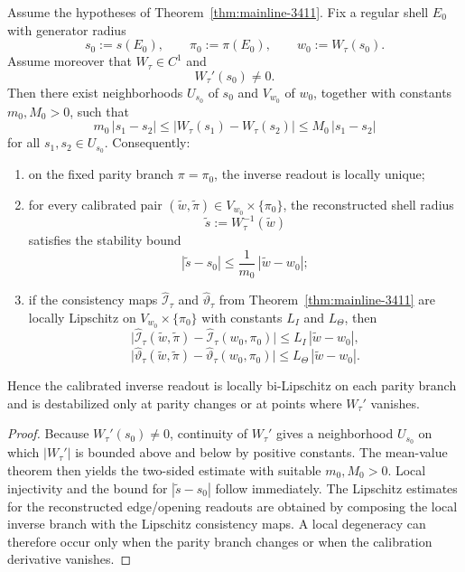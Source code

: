 \begin{theorem}
\label{thm:mainline-3412}
Assume the hypotheses of Theorem~\ref{thm:mainline-3411}. Fix a regular shell $E_0$ with generator radius
\[
  s_0:=s(E_0),
  \qquad
  \pi_0:=\pi(E_0),
  \qquad
  w_0:=W_\tau(s_0).
\]
Assume moreover that $W_\tau\in C^1$ and
\[
  W_\tau'(s_0)\neq 0.
\]
Then there exist neighborhoods $U_{s_0}$ of $s_0$ and $V_{w_0}$ of $w_0$, together with constants $m_0,M_0>0$, such that
\[
  m_0\,|s_1-s_2|
  \le
  |W_\tau(s_1)-W_\tau(s_2)|
  \le
  M_0\,|s_1-s_2|
\]
for all $s_1,s_2\in U_{s_0}$. Consequently:
\begin{enumerate}[label=(\roman*)]
  \item on the fixed parity branch $\pi=\pi_0$, the inverse readout is locally unique;
  \item for every calibrated pair $(\widetilde w,\widetilde\pi)\in V_{w_0}\times\{\pi_0\}$, the reconstructed shell radius
  \[
    \widetilde s:=W_\tau^{-1}(\widetilde w)
  \]
  satisfies the stability bound
  \[
    |\widetilde s-s_0|
    \le
    \frac{1}{m_0}\,|\widetilde w-w_0|;
  \]
  \item if the consistency maps $\widehat{\mathcal I}_\tau$ and $\widehat{\vartheta}_\tau$ from Theorem~\ref{thm:mainline-3411} are locally Lipschitz on $V_{w_0}\times\{\pi_0\}$ with constants $L_I$ and $L_\Theta$, then
  \[
    \bigl|\widehat{\mathcal I}_\tau(\widetilde w,\widetilde\pi)-\widehat{\mathcal I}_\tau(w_0,\pi_0)\bigr|
    \le L_I\,|\widetilde w-w_0|,
  \]
  \[
    \bigl|\widehat{\vartheta}_\tau(\widetilde w,\widetilde\pi)-\widehat{\vartheta}_\tau(w_0,\pi_0)\bigr|
    \le L_\Theta\,|\widetilde w-w_0|.
  \]
\end{enumerate}
Hence the calibrated inverse readout is locally bi-Lipschitz on each parity branch and is destabilized only at parity changes or at points where $W_\tau'$ vanishes.
\end{theorem}

\begin{proof}
Because $W_\tau'(s_0)\neq 0$, continuity of $W_\tau'$ gives a neighborhood $U_{s_0}$ on which $|W_\tau'|$ is bounded above and below by positive constants. The mean-value theorem then yields the two-sided estimate with suitable $m_0,M_0>0$. Local injectivity and the bound for $|\widetilde s-s_0|$ follow immediately. The Lipschitz estimates for the reconstructed edge/opening readouts are obtained by composing the local inverse branch with the Lipschitz consistency maps. A local degeneracy can therefore occur only when the parity branch changes or when the calibration derivative vanishes.
\end{proof}


